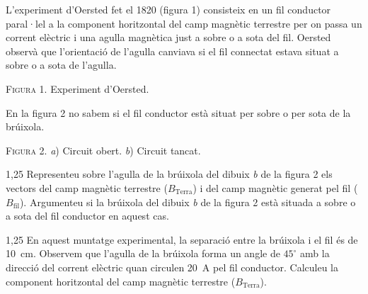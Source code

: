 L'experiment d'Oersted fet el 1820 (figura 1) consisteix en un fil conductor paral·lel a la component horitzontal del camp magnètic terrestre per on passa un corrent elèctric i una agulla magnètica just a sobre o a sota del fil. Oersted observà que l'orientació de l'agulla canviava si el fil connectat estava situat a sobre o a sota de l'agulla.

{\centering\small \textsc{Figura 1.} Experiment d'Oersted.\par}\medskip

En la figura 2 no sabem si el fil conductor està situat per sobre o per sota de la brúixola.

{\centering\small \textsc{Figura 2.} \textit{a}) Circuit obert. \textit{b}) Circuit tancat.\par}\medskip

\begin{apartat}{1,25}
Representeu sobre l'agulla de la brúixola del dibuix \textit{b} de la figura 2 els vectors del camp magnètic terrestre ($B_\mathrm{Terra}$) i del camp magnètic generat pel fil ($B_\mathrm{fil}$). Argumenteu si la brúixola del dibuix \textit{b} de la figura 2 està situada a sobre o a sota del fil conductor en aquest cas.
\end{apartat}

\begin{apartat}{1,25}
En aquest muntatge experimental, la separació entre la brúixola i el fil és de 10~cm. Observem que l'agulla de la brúixola forma un angle de $45^\circ$ amb la direcció del corrent elèctric quan circulen 20~A pel fil conductor. Calculeu la component horitzontal del camp magnètic terrestre ($B_\mathrm{Terra}$).
\end{apartat}

